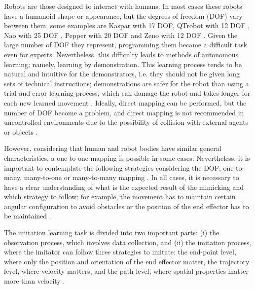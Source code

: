 \documentclass[thesis]{mas_proposal}
\begin{document}
    Robots are those designed to interact with humans. In most cases these robots have a humanoid shape or appearance, but the degrees of freedom (DOF) vary between them, some examples are Kaspar with 17 DOF\cite{Kaspar2023}, QTrobot with 12 DOF \cite{qtrobot_safety_manual}, Nao with 25 DOF \cite{softbankrobotics}, Pepper with 20 DOF \cite{softbankrobotics} and Zeno with 12 DOF \cite{Papakostas2021}. Given the large number of DOF they represent, programming them became a difficult task even for experts. Nevertheless, this difficulty leads to methods of autonomous learning; namely, learning by demonstration. This learning process tends to be natural and intuitive for the demonstrators, i.e. they should not be given long sets of technical instructions; demonstrations are safer for the robot than using a trial-and-error learning process, which can damage the robot and takes longer for each new learned movement \cite{Bandera2012}. Ideally, direct mapping can be performed, but the number of DOF become a problem, and direct mapping is not recommended in uncontrolled environments due to the possibility of collision with external agents or objects \cite{Bentivegna2004}.
    
    However, considering that human and robot bodies have similar general characteristics, a one-to-one mapping is possible in some cases. Nevertheless, it is important to contemplate the following strategies considering the DOF; one-to-many, many-to-one or many-to-many mapping \cite{Alissandrakis2007}. In all cases, it is necessary to have a clear understanding of what is the expected result of the mimicking and which strategy to follow; for example, the movement has to maintain certain angular configuration to avoid obstacles or the position of the end effector has to be maintained \cite{Bandera2010, Shin2001}.
    
    The imitation learning task is divided into two important parts: (i) the observation process, which involves data collection, and (ii) the imitation process, where the imitator can follow three strategies to imitate: the end-point level, where only the position and orientation of the end effector matter, the trajectory level, where velocity matters, and the path level, where spatial properties matter more than velocity \cite{Alissandrakis2002}.
    
\end{document}
